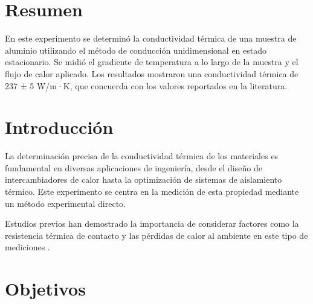 \documentclass[9pt,a4paper,twocolumn,twoside]{lab-class/lab}
\begin{document}
		
    \maketitle 
    \thispagestyle{firststyle} 
    \lababstract 
    

\section{Resumen}

    En este experimento se determinó la conductividad térmica de una muestra de aluminio utilizando el método de conducción unidimensional en estado estacionario. Se midió el gradiente de temperatura a lo largo de la muestra y el flujo de calor aplicado. Los resultados mostraron una conductividad térmica de 237 ± 5 W/m·K, que concuerda con los valores reportados en la literatura.

\section{Introducción}

    La determinación precisa de la conductividad térmica de los materiales es fundamental en diversas aplicaciones de ingeniería, desde el diseño de intercambiadores de calor hasta la optimización de sistemas de aislamiento térmico. Este experimento se centra en la medición de esta propiedad mediante un método experimental directo.
    
    Estudios previos han demostrado la importancia de considerar factores como la resistencia térmica de contacto y las pérdidas de calor al ambiente en este tipo de mediciones \cite{PFGPlots}.

\section{Objetivos}
\end{document}
